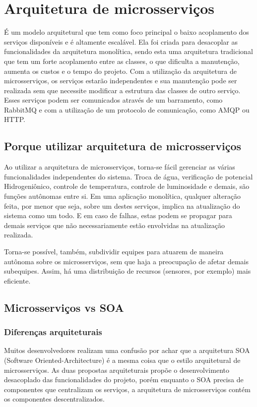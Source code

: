 \section{Arquitetura de microsserviços}

É um modelo arquitetural que tem como foco principal o baixo acoplamento dos serviços disponíveis e é altamente escalável. Ela foi criada para desacoplar as funcionalidades da arquitetura monolítica, sendo esta uma arquitetura tradicional que tem um forte acoplamento entre as classes, o que dificulta a manutenção, aumenta os custos e o tempo do projeto. Com a utilização da arquitetura de microsserviços, os serviços estarão independentes e sua manutenção pode ser realizada sem que necessite modificar a estrutura das classes de outro serviço. Esses serviços podem ser comunicados através de um barramento, como RabbitMQ e com a utilização de um protocolo de comunicação, como AMQP ou HTTP. 

\subsection{Porque utilizar arquitetura de microsserviços}

Ao utilizar a arquitetura de microsserviços, torna-se fácil gerenciar as várias funcionalidades independentes do sistema. Troca de água, verificação de potencial Hidrogeniônico, controle de temperatura, controle de luminosidade e demais, são funções autônomas entre si. Em uma aplicação monolítica, qualquer alteração feita, por menor que seja, sobre um destes serviços, implica na atualização do sistema como um todo. E em caso de falhas, estas podem se propagar para demais serviços que não necessariamente estão envolvidas na atualização realizada.

Torna-se possível, também, subdividir equipes para atuarem de maneira autônoma sobre os microsserviços, sem que haja a preocupação de afetar demais subequipes. Assim, há uma distribuição de recursos (sensores, por exemplo) mais eficiente.

\subsection{Microsserviços vs SOA}

\subsubsection{Diferenças arquiteturais}

Muitos desenvolvedores realizam uma confusão por achar que a arquitetura SOA (Software Oriented-Architecture) é a mesma coisa que o estilo arquitetural de microsserviços. As duas propostas arquiteturais propõe o desenvolvimento desacoplado das funcionalidades do projeto, porém enquanto o SOA precisa de componentes que centralizam os serviços, a arquitetura de microsserviços contém os componentes descentralizados. 


